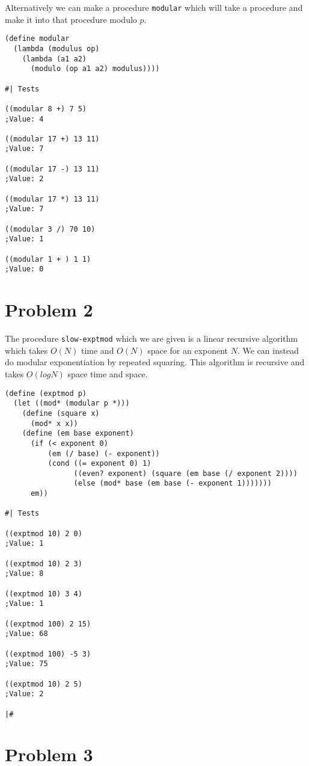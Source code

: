 \documentclass[12pt]{article}
\begin{document}
Alternatively we can make a procedure \texttt{modular} which will take
a procedure and make it into that procedure modulo $p$. 

\begin{verbatim}
(define modular
  (lambda (modulus op)
    (lambda (a1 a2)
      (modulo (op a1 a2) modulus))))

#| Tests

((modular 8 +) 7 5)
;Value: 4

((modular 17 +) 13 11)
;Value: 7

((modular 17 -) 13 11)
;Value: 2

((modular 17 *) 13 11)
;Value: 7

((modular 3 /) 70 10)
;Value: 1

((modular 1 + ) 1 1)
;Value: 0
\end{verbatim}

\section{Problem 2}

The procedure \texttt{slow-exptmod} which we are given is a linear
recursive algorithm which takes $O(N)$ time and $O(N)$ space for an
exponent $N$. We can instead do modular exponentiation by repeated
squaring. This algorithm is recursive and takes $O(log N)$ space time
and space.

\begin{verbatim}
(define (exptmod p)
  (let ((mod* (modular p *)))
    (define (square x)
      (mod* x x))
    (define (em base exponent)
      (if (< exponent 0)
          (em (/ base) (- exponent))
          (cond ((= exponent 0) 1)
                ((even? exponent) (square (em base (/ exponent 2))))
                (else (mod* base (em base (- exponent 1)))))))
      em))

#| Tests

((exptmod 10) 2 0)
;Value: 1

((exptmod 10) 2 3)
;Value: 8

((exptmod 10) 3 4)
;Value: 1

((exptmod 100) 2 15)
;Value: 68

((exptmod 100) -5 3)
;Value: 75

((exptmod 10) 2 5)
;Value: 2

|#
\end{verbatim}

\section{Problem 3}
\end{document}

